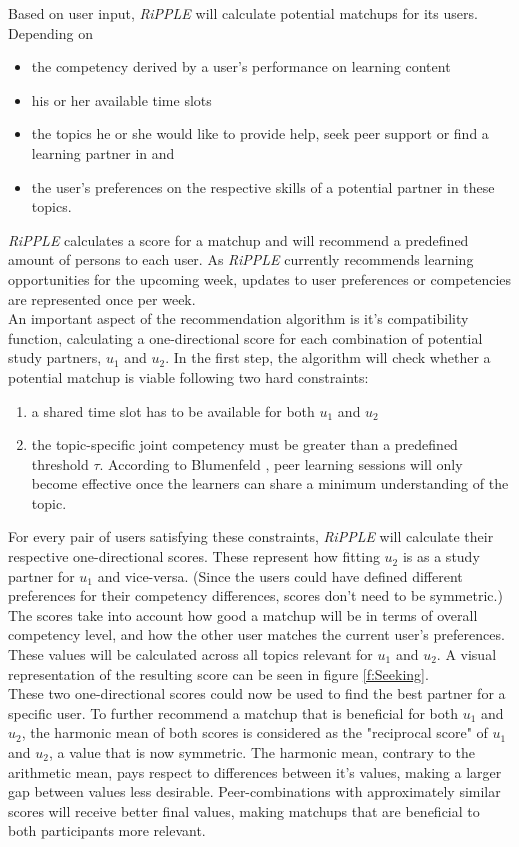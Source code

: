 \documentclass[conference]{IEEEtran}
\begin{document}
Based on user input, \textit{RiPPLE} will calculate potential matchups for its users. Depending on
\begin{itemize}
	\item the competency derived by a user's performance on learning content
	\item his or her available time slots
	\item the topics he or she would like to provide help, seek peer support or find a learning partner in and
	\item the user's preferences on the respective skills of a potential partner in these topics.
\end{itemize}
\textit{RiPPLE} calculates a score for a matchup and will recommend a predefined amount of persons to each user. As \textit{RiPPLE} currently recommends learning opportunities for the upcoming week, updates to user preferences or competencies are represented once per week.\\
An important aspect of the recommendation algorithm is it's compatibility function, calculating a one-directional score for each combination of potential study partners, \(u_1\) and \(u_2\). In the first step, the algorithm will check whether a potential matchup is viable following two hard constraints:
\begin{enumerate}
	\item a shared time slot has to be available for both \(u_1\) and \(u_2\)
	\item the topic-specific joint competency must be greater than a predefined threshold \(\tau\). According to Blumenfeld \cite{blumenfeld1996learning}, peer learning sessions will only become effective once the learners can share a minimum understanding of the topic.
\end{enumerate}
For every pair of users satisfying these constraints, \textit{RiPPLE} will calculate their respective one-directional scores. These represent how fitting \(u_2\) is as a study partner for \(u_1\) and vice-versa. (Since the users could have defined different preferences for their competency differences, scores don't need to be symmetric.) The scores take into account how good a matchup will be in terms of overall competency level, and how the other user matches the current user's preferences. These values will be calculated across all topics relevant for \(u_1\) and \(u_2\). A visual representation of the resulting score can be seen in figure \ref{f:Seeking}.\\
These two one-directional scores could now be used to find the best partner for a specific user. To further recommend a matchup that is beneficial for both \(u_1\) and \(u_2\), the harmonic mean of both scores is considered as the "reciprocal score" of \(u_1\) and \(u_2\), a value that is now symmetric. \cite{prabhakar2017reciprocal} The harmonic mean, contrary to the arithmetic mean, pays respect to differences between it's values, making a larger gap between values less desirable. Peer-combinations with approximately similar scores will receive better final values, making matchups that are beneficial to both participants more relevant.\\
\end{document}
